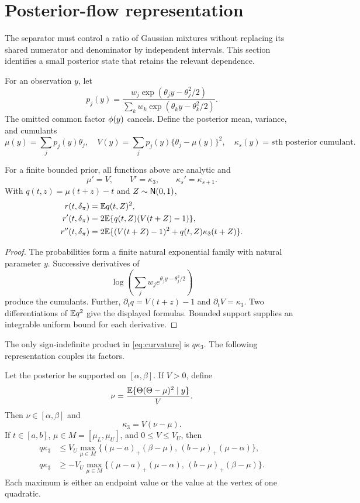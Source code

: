 \section{Posterior-flow representation}
\label{sec:flow}

The separator must control a ratio of Gaussian mixtures without replacing
its shared numerator and denominator by independent intervals.  This section
identifies a small posterior state that retains the relevant dependence.

For an observation $y$, let
\[
 p_j(y)=\frac{w_j\exp(\theta_jy-\theta_j^2/2)}
 {\sum_k w_k\exp(\theta_ky-\theta_k^2/2)}.
\]
The omitted common factor $\phi(y)$ cancels.  Define the posterior mean,
variance, and cumulants
\[
 \mu(y)=\sum_jp_j(y)\theta_j,\quad
 V(y)=\sum_jp_j(y)\{\theta_j-\mu(y)\}^2,\quad
 \kappa_s(y)=\text{$s$th posterior cumulant}.
\]

\begin{proposition}
\label{prop:flow}
For a finite bounded prior, all functions above are analytic and
\[
 \mu'=V,\qquad V'=\kappa_3,\qquad \kappa_s'=\kappa_{s+1}.
\]
With $q(t,z)=\mu(t+z)-t$ and $Z\sim\mathsf N(0,1)$,
\begin{align}
 r(t,\delta_\pi)&=\mathbb E q(t,Z)^2,\\
 r'(t,\delta_\pi)&=2\mathbb E\{q(t,Z)(V(t+Z)-1)\},\\
 r''(t,\delta_\pi)&=
 2\mathbb E\{(V(t+Z)-1)^2+q(t,Z)\kappa_3(t+Z)\}.
 \label{eq:curvature}
\end{align}
\end{proposition}

\begin{proof}
The probabilities form a finite natural exponential family with natural
parameter $y$.  Successive derivatives of
\[
 \log\!\left(\sum_jw_j e^{\theta_jy-\theta_j^2/2}\right)
\]
produce the cumulants.  Further,
$\partial_tq=V(t+z)-1$ and
$\partial_tV=\kappa_3$.  Two differentiations of $\mathbb E q^2$ give the displayed
formulas.  Bounded support supplies an integrable uniform bound for each
derivative.
\end{proof}

The only sign-indefinite product in \eqref{eq:curvature} is $q\kappa_3$.
The following representation couples its factors.

\begin{lemma}
\label{lem:common-mean-bound}
Let the posterior be supported on $[\alpha,\beta]$.  If $V>0$, define
\[
 \nu=\frac{\mathbb E\{\Theta(\Theta-\mu)^2\mid y\}}{V}.
\]
Then $\nu\in[\alpha,\beta]$ and
\[
 \kappa_3=V(\nu-\mu).
\]
If $t\in[a,b]$, $\mu\in M=[\mu_L,\mu_U]$, and $0\le V\le V_U$, then
\begin{align}
 q\kappa_3
 &\le V_U\max_{\mu\in M}
 \bigl\{(\mu-a)_+(\beta-\mu),\,
        (b-\mu)_+(\mu-\alpha)\bigr\}, \label{eq:joint-upper}\\
 q\kappa_3
 &\ge -V_U\max_{\mu\in M}
 \bigl\{(\mu-a)_+(\mu-\alpha),\,
        (b-\mu)_+(\beta-\mu)\bigr\}. \label{eq:joint-lower}
\end{align}
Each maximum is either an endpoint value or the value at the vertex of one
quadratic.
\end{lemma}

